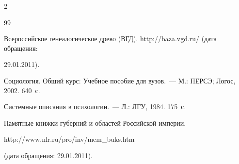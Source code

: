 \begin{multicols}{2}
{{\begin{thebibliography}{99}


Всероссийское генеалогическое древо (ВГД). {\sf http://baza.vgd.ru/} (дата обращения: 


29.01.2011).









Социология. Общий курс: Учебное пособие для вузов.~--- М.: ПЕРСЭ; Логос, 2002. 640~с.









Системные описания в психологии.~--- Л.: ЛГУ, 1984.  175~с.





\label{end\stat}







Памятные книжки губерний и областей Российской империи. {\sf 


http://www.nlr.ru/pro/inv/mem\_buks.htm} (дата обращения: 29.01.2011).


 \end{thebibliography}


}


}








\end{multicols}


